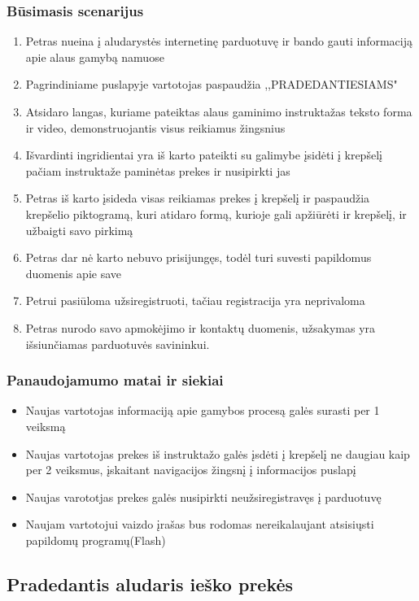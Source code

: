 \documentclass[oneside]{VUMIFPSkursinis}
\begin{document}
		\subsubsection{Būsimasis scenarijus}
			\begin{enumerate}
				\item{Petras nueina į aludarystės internetinę parduotuvę ir bando gauti informaciją apie alaus gamybą namuose}
				\item{Pagrindiniame puslapyje vartotojas paspaudžia ,,PRADEDANTIESIAMS"}
				\item{Atsidaro langas, kuriame pateiktas alaus gaminimo instruktažas teksto forma ir video, demonstruojantis visus reikiamus žingsnius}
				\item{Išvardinti ingridientai yra iš karto pateikti su galimybe įsidėti į krepšelį pačiam instruktaže paminėtas prekes ir nusipirkti jas}
				\item{Petras iš karto įsideda visas reikiamas prekes į krepšelį ir paspaudžia krepšelio piktogramą, kuri atidaro formą, kurioje gali apžiūrėti ir krepšelį, ir užbaigti savo pirkimą}
				\item{Petras dar nė karto nebuvo prisijungęs, todėl turi suvesti papildomus duomenis apie save}
				\item{Petrui pasiūloma užsiregistruoti, tačiau registracija yra neprivaloma}
				\item{Petras nurodo savo apmokėjimo ir kontaktų duomenis, užsakymas yra išsiunčiamas parduotuvės savininkui.}
			\end{enumerate}
		\subsubsection{Panaudojamumo matai ir siekiai}
			\begin{itemize}
				\item{Naujas vartotojas informaciją apie gamybos procesą galės surasti per 1 veiksmą}
				\item{Naujas vartotojas prekes iš instruktažo galės įsdėti į krepšelį ne daugiau kaip per 2 veiksmus, įskaitant navigacijos žingsnį į informacijos puslapį}
				\item{Naujas varototjas prekes galės nusipirkti neužsiregistravęs į parduotuvę}
				\item{Naujam vartotojui vaizdo įrašas bus rodomas nereikalaujant atsisiųsti papildomų programų(Flash)}
			\end{itemize}

	\subsection{Pradedantis aludaris ieško prekės}
\end{document}
